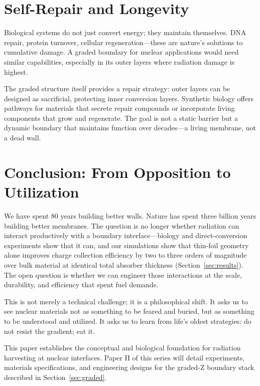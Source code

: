 \documentclass[12pt]{article}
\begin{document}
\section{Self-Repair and Longevity}

Biological systems do not just convert energy; they maintain themselves. DNA repair,
protein turnover, cellular regeneration---these are nature's solutions to cumulative
damage. A graded boundary for nuclear applications would need similar capabilities,
especially in its outer layers where radiation damage is highest.

The graded structure itself provides a repair strategy: outer layers can be designed as
sacrificial, protecting inner conversion layers. Synthetic biology offers pathways for
materials that secrete repair compounds or incorporate living components that grow and
regenerate. The goal is not a static barrier but a dynamic boundary that maintains
function over decades---a living membrane, not a dead wall.

\section{Conclusion: From Opposition to Utilization}

We have spent 80 years building better walls. Nature has spent three billion years
building better membranes. The question is no longer whether radiation can interact
productively with a boundary interface---biology and direct-conversion experiments show
that it can, and our simulations show that thin-foil geometry alone improves charge
collection efficiency by two to three orders of magnitude over bulk material at identical
total absorber thickness (Section~\ref{sec:results}). The open
question is whether we can engineer those interactions at the scale, durability, and
efficiency that spent fuel demands.

This is not merely a technical challenge; it is a philosophical shift. It asks us to see
nuclear materials not as something to be feared and buried, but as something to be
understood and utilized. It asks us to learn from life's oldest strategies: do not resist
the gradient; eat it.

This paper establishes the conceptual and biological foundation for radiation harvesting
at nuclear interfaces. Paper II of this series will detail experiments, materials
specifications, and engineering designs for the graded-Z boundary stack described in
Section~\ref{sec:graded}.



\end{document}
